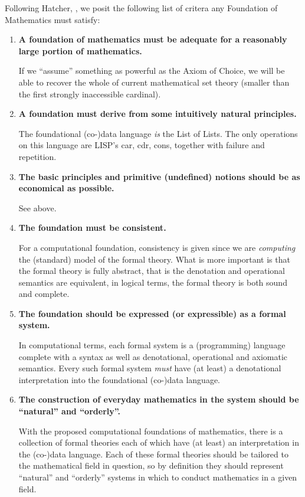 Following Hatcher, \cite{hatcher1982logicalFoundationsMath}, we posit the
following list of critera any Foundation of Mathematics must satisfy:

\begin{enumerate}
\item \textbf{A foundation of mathematics must be adequate for a reasonably large
portion of mathematics.}

\noindent If we ``assume'' something as powerful as the Axiom of Choice, we will
be able to recover the whole of current mathematical set theory (smaller than
the first strongly inaccessible cardinal).

\item \textbf{A foundation must derive from some intuitively natural principles.}

\noindent The foundational (co-)data language \emph{is} the List of Lists. The
only operations on this language are LISP's car, cdr, cons, together with
failure and repetition.

\item \textbf{The basic principles and primitive (undefined) notions should be
as economical as possible.}

\noindent See above.

\item \textbf{The foundation must be consistent.}

\noindent For a computational foundation, consistency is given since we are
\emph{computing} the (standard) model of the formal theory. What is more
important is that the formal theory is fully abstract, that is the denotation
and operational semantics are equivalent, in logical terms, the formal theory is
both sound and complete.

\item \textbf{The foundation should be expressed (or expressible) as a formal system.}

\noindent In computational terms, each formal system is a (programming) language
complete with a syntax as well as denotational, operational and axiomatic
semantics. Every such formal system \emph{must} have (at least) a denotational
interpretation into the foundational (co-)data language.

\item \textbf{The construction of everyday mathematics in the system should be
``natural'' and ``orderly''.}

\noindent With the proposed computational foundations of mathematics, there is a
collection of formal theories each of which have (at least) an interpretation in
the (co-)data language. Each of these formal theories should be tailored to the
mathematical field in question, so by definition they should represent
``natural'' and ``orderly'' systems in which to conduct mathematics in a given
field.

\end{enumerate}

